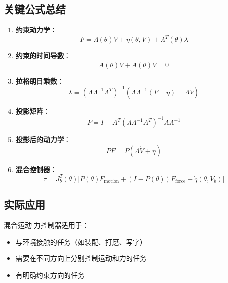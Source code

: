 \documentclass[12pt,a4paper]{article}
\begin{document}
\subsection{关键公式总结}

\begin{enumerate}
\item \textbf{约束动力学}：
\begin{equation}
F = \Lambda(\theta)\dot{V} + \eta(\theta, V) + A^T(\theta)\lambda
\end{equation}

\item \textbf{约束的时间导数}：
\begin{equation}
A(\theta)\dot{V} + \dot{A}(\theta)V = 0
\end{equation}

\item \textbf{拉格朗日乘数}：
\begin{equation}
\lambda = (A\Lambda^{-1}A^T)^{-1}(A\Lambda^{-1}(F - \eta) - A\dot{V})
\end{equation}

\item \textbf{投影矩阵}：
\begin{equation}
P = I - A^T(A\Lambda^{-1}A^T)^{-1}A\Lambda^{-1}
\end{equation}

\item \textbf{投影后的动力学}：
\begin{equation}
PF = P(\Lambda\dot{V} + \eta)
\end{equation}

\item \textbf{混合控制器}：
\begin{equation}
\tau = J_b^T(\theta)\Bigg[P(\theta)F_{\text{motion}} + (I - P(\theta))F_{\text{force}} + \tilde{\eta}(\theta, V_b)\Bigg]
\end{equation}
\end{enumerate}

\subsection{实际应用}

混合运动-力控制器适用于：
\begin{itemize}
\item 与环境接触的任务（如装配、打磨、写字）
\item 需要在不同方向上分别控制运动和力的任务
\item 有明确约束方向的任务
\end{itemize}
\end{document}
